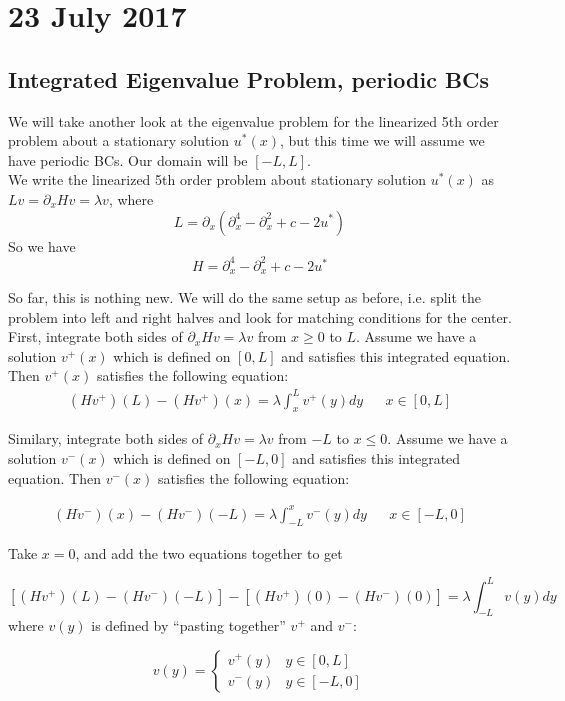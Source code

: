 \documentclass[12pt]{article}
\begin{document}
\section*{23 July 2017}

\subsection*{Integrated Eigenvalue Problem, periodic BCs}

We will take another look at the eigenvalue problem for the linearized 5th order problem about a stationary solution $u^*(x)$, but this time we will assume we have periodic BCs. Our domain will be $[-L, L]$.\\

We write the linearized 5th order problem about stationary solution $u^*(x)$ as $Lv = \partial_x Hv = \lambda v$, where
\[
L = \partial_x( \partial_x^4 - \partial_x^2 + c - 2u^*)
\]
So we have 
\[
H = \partial_x^4 - \partial_x^2 + c - 2u^*
\]

So far, this is nothing new. We will do the same setup as before, i.e. split the problem into left and right halves and look for matching conditions for the center.\\

First, integrate both sides of $\partial_x Hv = \lambda v$ from $x\geq 0$ to $L$. Assume we have a solution $v^+(x)$ which is defined on $[0, L]$ and satisfies this integrated equation. Then $v^+(x)$ satisfies the following equation:
\begin{align*}
(Hv^+)(L) -(Hv^+)(x) = \lambda \int_x^L v^+(y) dy && x \in [0, L]
\end{align*}

Similary, integrate both sides of $\partial_x Hv = \lambda v$ from $-L$ to $x \leq 0$. Assume we have a solution $v^-(x)$ which is defined on $[-L,0]$ and satisfies this integrated equation. Then $v^-(x)$ satisfies the following equation:

\begin{align*}
(Hv^-)(x) - (Hv^-)(-L) = \lambda \int_{-L}^x v^-(y) dy && x \in [-L, 0]
\end{align*}

Take $x = 0$, and add the two equations together to get

\[
[(Hv^+)(L) - (Hv^-)(-L)] - [(Hv^+)(0) - (Hv^-)(0)] = \lambda \int_{-L}^L v(y) dy
\]
where $v(y)$ is defined by ``pasting together'' $v^+$ and $v^-$:

\[
v(y) = \begin{cases}
v^+(y) & y \in [0, L] \\
v^-(y) & y \in [-L, 0]
\end{cases}
\]
\end{document}
